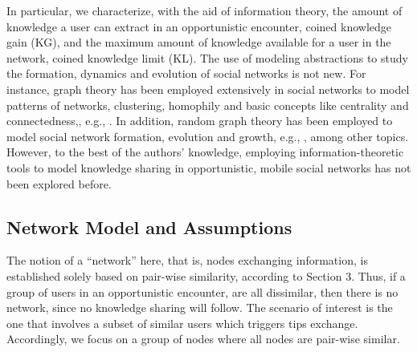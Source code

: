\documentclass[12pt,epsf]{article}
\theoremstyle{definition}
\begin{document}
In particular, we characterize, with the aid of information theory, the amount of knowledge a user can extract in an opportunistic encounter, coined knowledge gain (KG), and the maximum amount of knowledge available for a user in the network, coined knowledge limit (KL). The use of modeling abstractions to study the formation, dynamics and evolution of social networks is not new. For instance, graph theory has been employed extensively  in social networks to model patterns of networks, clustering, homophily and basic concepts like centrality and connectedness,, e.g., \cite{graph1,graph3}. In
addition, random graph theory has been employed to model social network formation, evolution and growth, e.g., \cite{erdos,graph2}, among other topics. However, to the best of the authors' knowledge, employing information-theoretic tools to model knowledge sharing in opportunistic, mobile social networks has not been explored before.


\vspace{-0.5 cm}
\subsection{Network Model and Assumptions}
\vspace{-0.2 cm}
The notion of a ``network'' here, that is, nodes exchanging information, 
is established solely based on pair-wise similarity, according to Section 3.
Thus, if a group of users in an opportunistic encounter, are all dissimilar, then there is no 
network, since no knowledge sharing will follow. The scenario of interest is the one that involves a subset of similar users which triggers tips exchange. Accordingly, we focus on a group of nodes where all nodes are pair-wise similar.
  
\end{document}
